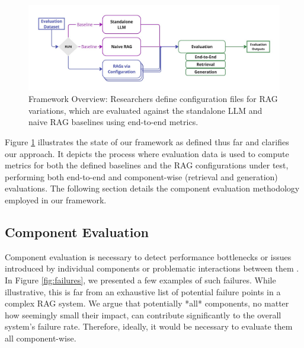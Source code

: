 \begin{figure}[!ht]
  \centering
  \includegraphics[width=\textwidth]{images/FrameworkBaselines.pdf}
  \caption{Framework Overview: Researchers define configuration files for RAG variations, which are evaluated against the standalone LLM and naive RAG baselines using end-to-end metrics.}
  \label{fig:framework-baselines}
\end{figure}

Figure \ref{fig:framework-baselines} illustrates the state of our framework as defined thus far and clarifies our approach. It depicts the process where evaluation data is used to compute metrics for both the defined baselines and the RAG configurations under test, performing both end-to-end and component-wise (retrieval and generation) evaluations. The following section details the component evaluation methodology employed in our framework.

\subsection{Component Evaluation}

Component evaluation is necessary to detect performance bottlenecks or issues introduced by individual components or problematic interactions between them \cite{Salemi.2024}. In Figure \ref{fig:failures}, we presented a few examples of such failures. While illustrative, this is far from an exhaustive list of potential failure points in a complex RAG system. We argue that potentially *all* components, no matter how seemingly small their impact, can contribute significantly to the overall system's failure rate. Therefore, ideally, it would be necessary to evaluate them all component-wise.

